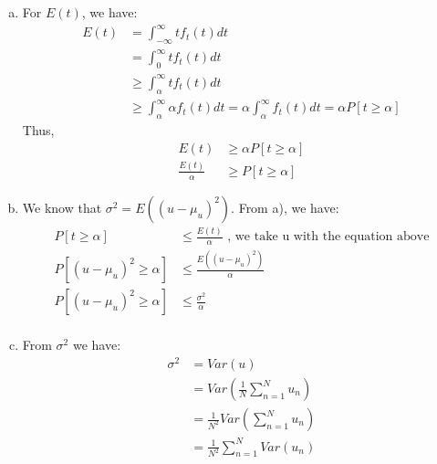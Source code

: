 \documentclass{article}
\def\math#1{$#1$}
\begin{document}
\begin{enumerate}[a)]
    \item For \math{E(t)}, we have:
        \begin{equation}
            \begin{split}
                E(t) &= \int_{-\infty}^{\infty} t f_t(t)dt \\
                &= \int_{0}^{\infty} t f_t(t)dt \\
                &\geq \int_{\alpha}^{\infty} t f_t(t)dt \\
                &\geq \int_{\alpha}^{\infty} \alpha f_t(t)dt = \alpha \int_{\alpha}^{\infty} f_t(t)dt = \alpha P[t \geq \alpha]
            \end{split}
        \end{equation}
        Thus,
        \begin{equation}
            \begin{split}
                E(t) &\geq \alpha P[t \geq \alpha] \\
                \frac{E(t)}{\alpha} &\geq P[t \geq \alpha]
            \end{split}
        \end{equation}
    \item We know that \math{\sigma^2 = E((u - \mu_u)^2)}. From a), we have:
        \begin{equation}
            \begin{split}
                P[t \geq \alpha] &\leq \frac{E(t)}{\alpha} \text{ , we take u with the equation above} \\
                P[(u - \mu_u)^2 \geq \alpha] &\leq \frac{E((u - \mu_u)^2)}{\alpha} \\
                P[(u - \mu_u)^2 \geq \alpha] &\leq \frac{\sigma^2}{\alpha} \\
            \end{split}
        \end{equation}
    \item From \math{\sigma^2} we have:
        \begin{equation}
            \begin{split}
                \sigma^2 &= Var(u) \\
                &= Var(\frac{1}{N} \sum_{n = 1}^N u_n) \\
                &= \frac{1}{N^2} Var(\sum_{n = 1}^N u_n) \\  %
                &= \frac{1}{N^2} \sum_{n = 1}^N Var(u_n)  \\ %

\end{split}
\end{equation}
\end{enumerate}
\end{document}
